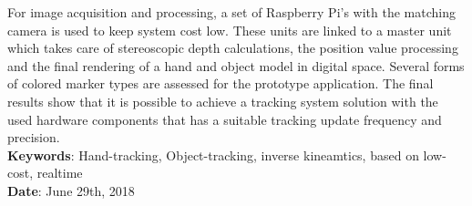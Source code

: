 \begin{titlepage}
For image acquisition and processing, a set of Raspberry Pi's with the matching camera is used to keep system cost low. These units are linked to a master unit which takes care of stereoscopic depth calculations, the position value processing and the final rendering of a hand and object model in digital space. Several forms of colored marker types are assessed for the prototype application. The final results show that it is possible to achieve a tracking system solution with the used hardware components that has a suitable tracking update frequency and precision.\\
\textbf{Keywords}: Hand-tracking, Object-tracking, inverse kineamtics, based on low-cost, realtime \\
\textbf{Date}: June 29th, 2018\\

\end{titlepage}
